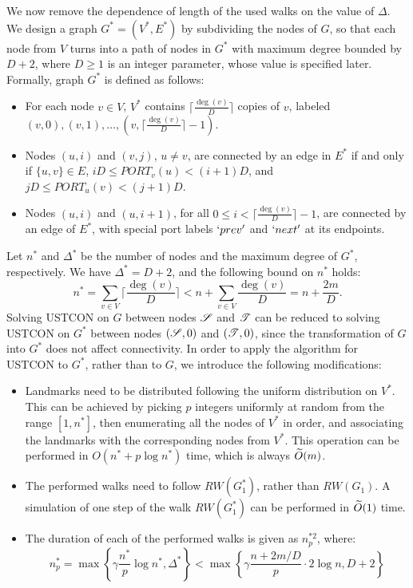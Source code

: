\documentclass[11pt,a4paper]{article}
\renewcommand{\O}{\ensuremath \widetilde O}
\newcommand{\s}{\ensuremath  \mathscr S}
\renewcommand{\t}{\ensuremath \mathscr  T}
\renewcommand{\*}{\hspace*{5mm}}
\begin{document}
We now remove the dependence of length of the used walks on the value of $\Delta$. We design a graph $G^*=(V^*,E^*)$ by subdividing the nodes of $G$, so that each node from $V$ turns into a path of nodes in $G^*$ with maximum degree bounded by $D+2$, where $D \geq 1$ is an integer parameter, whose value is specified later. Formally, graph $G^*$ is defined as follows:
\begin{itemize}
\item For each node $v\in V$, $V^*$ contains $\lceil \frac{\deg(v)}{D}\rceil$ copies of $v$, labeled $(v,0),(v,1),\ldots, (v,\lceil \frac{\deg(v)}{D}\rceil-1)$.
\item Nodes $(u,i)$ and $(v,j)$, $u\neq v$, are connected by an edge in $E^*$ if and only if $\{u,v\}\in E$, $iD \leq PORT_v(u) < (i+1)D$, and $jD \leq PORT_u(v) < (j+1)D$.
\item Nodes $(u,i)$ and $(u,i+1)$, for all $0 \leq i <  \lceil\frac{\deg(v)}{D}\rceil-1$, are connected by an edge of $E^*$, with special port labels $`prev'$ and $`next'$ at its endpoints.
\end{itemize}
Let $n^*$ and $\Delta^*$ be the number of nodes and the maximum degree of $G^*$, respectively. We have $\Delta^* = D + 2$, and the following bound on $n^*$ holds:
$$
n^* = \sum_{v \in V} \lceil \frac{\deg(v)}{D}\rceil <  n + \sum_{v \in V} \frac{\deg(v)}{D} = n + \frac{2m}{D}.
$$
Solving USTCON on $G$ between nodes $\s$ and $\t$ can be reduced to solving USTCON on $G^*$ between nodes $(\s, 0)$ and $(\t, 0)$, since the transformation of $G$ into $G^*$ does not affect connectivity. In order to apply the algorithm for USTCON to $G^*$, rather than to $G$, we introduce the following modifications:
\begin{itemize}
\item Landmarks need to be distributed following the uniform distribution on $V^*$. This can be achieved by picking $p$ integers uniformly at random from the range $[1, n^*]$, then enumerating all the nodes of $V^*$ in order, and associating the landmarks with the corresponding nodes from $V^*$. This operation can be performed in $O(n^* + p\log n^*)$ time, which is always $\O(m)$.
\item The performed walks need to follow $RW(G^*_1)$, rather than $RW(G_1)$. A simulation of one step of the walk $RW(G^*_1)$ can be performed in $\O(1)$ time.
\item The duration of each of the performed walks is given as $n_p^{*2}$, where:
\begin{equation}\label{eqn0}
n_p^* = \max\left\{\gamma \frac{n^*}{p} \log n^*, \Delta^*\right\} < \max \left\{ \gamma\frac{n + 2m/D}{p} \cdot 2\log n, D+2\right\}
\end{equation}
\end{itemize}
\end{document}

